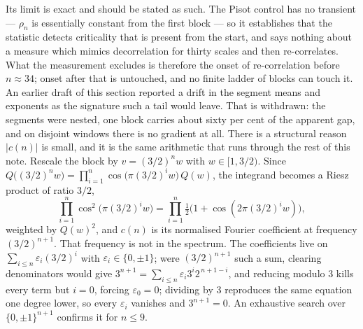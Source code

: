 \documentclass[11pt]{article}
\theoremstyle{remark}
\newcommand{\eps}{\varepsilon}
\begin{document}
Its limit is exact and should be stated as such. The Pisot control has no transient --- $\rho_n$ is
essentially constant from the first block --- so it establishes that the statistic detects criticality
that is present from the start, and says nothing about a measure which mimics decorrelation for thirty
scales and then re-correlates. What the measurement excludes is therefore the onset of re-correlation
before $n\approx34$; onset after that is untouched, and no finite ladder of blocks can touch it. An
earlier draft of this section reported a drift in the segment means and exponents as the signature such a
tail would leave. That is withdrawn: the segments were nested, one block carries about sixty per cent of
the apparent gap, and on disjoint windows there is no gradient at all.
There is a structural reason $|c(n)|$ is small, and it is the same arithmetic that runs through the rest
of this note. Rescale the block by $v=(3/2)^nw$ with $w\in[1,3/2)$. Since
$Q\bigl((3/2)^nw\bigr)=\prod_{i=1}^{n}\cos\bigl(\pi(3/2)^iw\bigr)\,Q(w)$, the integrand becomes a Riesz
product of ratio $3/2$,
\[
  \prod_{i=1}^{n}\cos^2\bigl(\pi(3/2)^iw\bigr)
  =\prod_{i=1}^{n}\tfrac12\bigl(1+\cos(2\pi(3/2)^iw)\bigr),
\]
weighted by $Q(w)^2$, and $c(n)$ is its normalised Fourier coefficient at frequency $(3/2)^{n+1}$. That
frequency is not in the spectrum. The coefficients live on $\sum_{i\le n}\eps_i(3/2)^i$ with
$\eps_i\in\{0,\pm1\}$; were $(3/2)^{n+1}$ such a sum, clearing denominators would give
$3^{n+1}=\sum_{i\le n}\eps_i3^i2^{\,n+1-i}$, and reducing modulo $3$ kills every term but $i=0$, forcing
$\eps_0=0$; dividing by $3$ reproduces the same equation one degree lower, so every $\eps_i$ vanishes and
$3^{n+1}=0$. An exhaustive search over $\{0,\pm1\}^{n+1}$ confirms it for $n\le9$.
\end{document}
